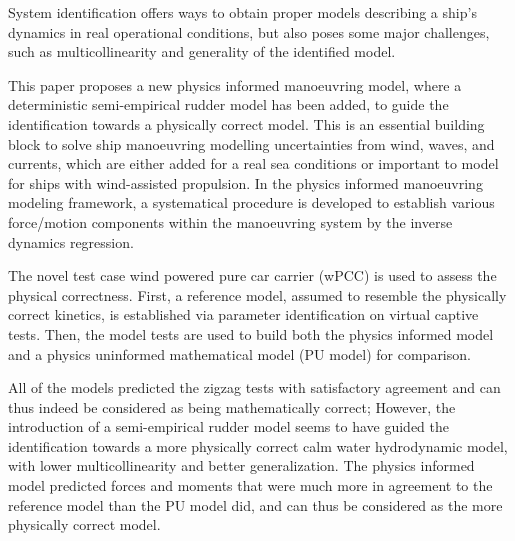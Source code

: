 System identification offers ways to obtain proper models describing a ship's dynamics in real operational conditions, but also poses some major challenges, such as multicollinearity and generality of the identified model. 

This paper proposes a new physics informed manoeuvring model, where a deterministic semi-empirical rudder model has been added, to guide the identification towards a physically correct model.  
This is an essential building block to solve ship manoeuvring modelling uncertainties from wind, waves, and currents, which are either added for a real sea conditions or important to model for ships with wind-assisted propulsion.
In the physics informed manoeuvring modeling framework, a systematical procedure is developed to establish various force/motion components within the manoeuvring system by the inverse dynamics regression. 

The novel test case wind powered pure car carrier (wPCC) is used to assess the physical correctness. First, a reference model, assumed to resemble the physically correct kinetics, is established via parameter identification on virtual captive tests. Then, the model tests are used to build both the physics informed model and a physics uninformed mathematical model (PU model) for comparison.

All of the models predicted the zigzag tests with satisfactory agreement and can thus indeed be considered as being mathematically correct; However, the introduction of a semi-empirical rudder model seems to have guided the identification towards a more physically correct calm water hydrodynamic model, with lower multicollinearity and better generalization. The physics informed model predicted forces and moments that were much more in agreement to the reference model than the PU model did, and can thus be considered as the more physically correct model. 

